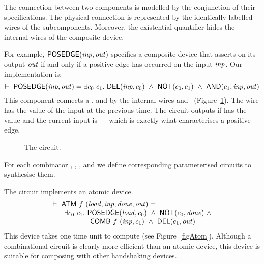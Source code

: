 The connection between two components is modelled
by the conjunction of their specifications.
The physical connection is represented by
the identically-labelled wires of the subcomponents.
Moreover,  the existential quantifier hides the 
internal wires of the composite device.

For example, $\mathsf{POSEDGE}(\mathit{inp},\mathit{out})$ specifies a composite
device that asserts  on its output $\mathit{out}$ if and only if a positive edge
has occurred on the input $\mathit{inp}$. Our implementation is:
\[
\TURNST\ \DEF{POSEDGE} (\VAR{inp},\VAR{out}) = 
    \exists c_0~ c_1.\ \DEF{DEL} (\VAR{inp},c_0)\ \AND\
                  \DEF{NOT} (c_0, c_1)\ \AND\ \DEF{AND} (c_1,\VAR{inp},\VAR{out})
\]
This component connects a ,  and 
by the internal wires  and~ (Figure~\ref{figPosedge}).
The wire  has the value of the
input at the previous time. The circuit outputs  if
\sVAR{c}{0} has the value  and the current input is  ---
which is exactly what characterises a positive edge.
\begin{figure}[htb]
   \centerline{}
   \caption{\label{figPosedge}The  circuit.}
\end{figure}



For each combinator , , ,
 and  we define corresponding
parameterised circuits to synthesise them.

The circuit  implements an atomic device.
\[
\begin{array}{l}
\TURNST\ \DEF{ATM}\ f\ (\VAR{load,inp,done,out}) =\\
\phantom{\TURNST\ ~~}    \exists c_0~ c_1.\ \DEF{POSEDGE} (\VAR{load}, c_0)\ \AND \ 
\DEF{NOT} (c_0, \VAR{done})\ \AND\\
\phantom{\TURNST\ ~~\exists c_0, c_1.\ }  \DEF{COMB}\ f\ (\VAR{inp},c_1)\ \AND\ \DEF{DEL} (c_1,\VAR{out})
\end{array}
\]
This device takes one time unit to compute (see Figure~\ref{figAtom}).
Although a combinational circuit is 
clearly more efficient than an atomic device,
this device is suitable for composing with other
handshaking devices.

